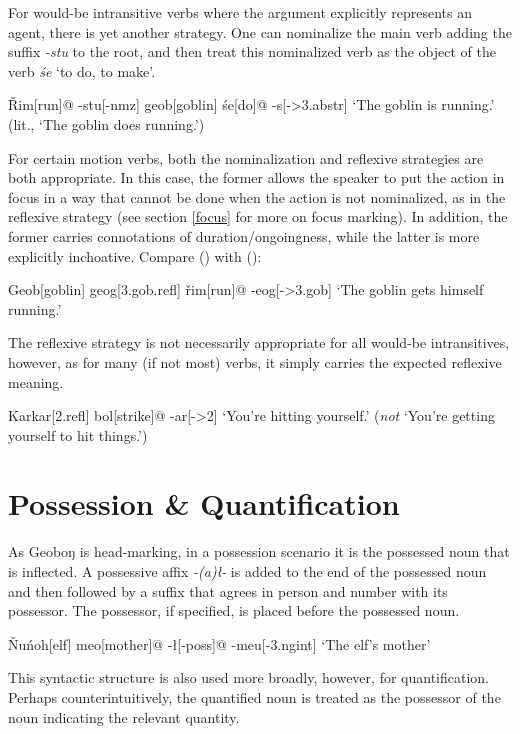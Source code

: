 \documentclass[a4paper,11pt,oneside,openany]{memoir}
\newcommand{\vr}{ř}
\newcommand{\vR}{Ř}
\newcommand{\vN}{Ň}
\newcommand{\engma}{ŋ}
\begin{document}
For would-be intransitive verbs where the argument explicitly represents an agent, there is yet another strategy. One can nominalize the main verb adding the suffix \textit{-stu} to the root, and then treat this nominalized verb as the object of the verb \textit{\'se} `to do, to make'.

\ex
\begingl
\vR im[run]@
-stu[-{\sc nmz}]
geob[goblin]
\'se[do]@
-s[-{\sc >3.abstr}]
\glft  `The goblin is running.' (lit., `The goblin does running.')
\endgl
\xe

For certain motion verbs, both the nominalization and reflexive strategies are both appropriate. In this case, the former allows the speaker to put the action in focus in a way that cannot be done when the action is not nominalized, as in the reflexive strategy (see section \ref{focus} for more on focus marking). In addition, the former carries connotations of duration/ongoingness, while the latter is more explicitly inchoative. Compare (\lastx) with (\nextx):

\ex
\begingl
Geob[goblin]
geog[{\sc 3.gob.refl}]
\vr im[run]@
-eog[-{\sc >3.gob}]
\glft `The goblin gets himself running.'
\endgl
\xe

The reflexive strategy is not necessarily appropriate for all would-be intransitives, however, as for many (if not most) verbs, it simply carries the expected reflexive meaning.

\ex
\begingl
Karkar[{\sc 2.refl}]
bol[strike]@
-ar[-{\sc >2}]
\glft  `You're hitting yourself.' (\emph{not} `You're getting yourself to hit things.')
\endgl
\xe

\section{Possession \& Quantification}

As Geobo{\engma} is head-marking, in a possession scenario it is the possessed noun that is inflected. A possessive affix \textit{-(a)\l-} is added to the end of the possessed noun and then followed by a suffix that agrees in person and number with its possessor. The possessor, if specified, is placed before the possessed noun.

\ex
\begingl
\vN u\'noh[elf]
meo[mother]@
-\l[-{\sc poss}]@
-meu[-{\sc 3.ngint}]
\glft  `The elf's mother'
\endgl
\xe

This syntactic structure is also used more broadly, however, for quantification. Perhaps counterintuitively, the quantified noun is treated as the possessor of the noun indicating the relevant quantity.
\end{document}

